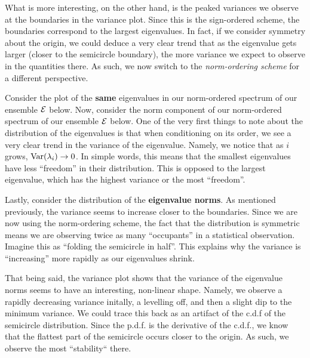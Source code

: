 What is more interesting, on the other hand, is the peaked variances we observe at the boundaries in the variance plot. Since this is the sign-ordered scheme, the boundaries correspond to the largest eigenvalues. In fact, if we consider symmetry about the origin, we could deduce a very clear trend that as the eigenvalue gets larger (closer to the semicircle boundary), the more variance we expect to observe in the quantities there. As such, we now switch to the \textit{norm-ordering scheme} for a different perspective.

\trim
{}%

\newpage

Consider the plot of the \textbf{same} eigenvalues in our norm-ordered spectrum of our ensemble $\mathcal{E}$ below.
Now, consider the norm component of our norm-ordered spectrum of our ensemble $\mathcal{E}$ below. One of the very first things to note about the distribution of the eigenvalues is that when conditioning on its order, we see a very clear trend in the variance of the eigenvalue. Namely, we notice that as $i$ grows, $\text{Var}(\lambda_i) \to 0$. In simple words, this means that the smallest eigenvalues have less ``freedom'' in their distribution. This is opposed to the largest eigenvalue, which has the highest variance or the most ``freedom''.

\trim
{}%

\newpage

Lastly, consider the distribution of the \textbf{eigenvalue norms}. As mentioned previously, the variance seems to increase closer to the boundaries. Since we are now using the norm-ordering scheme, the fact that the distribution is symmetric means we are observing twice as many ``occupants'' in a statistical observation. Imagine this as ``folding the semicircle in half''. This explains why the variance is ``increasing'' more rapidly as our eigenvalues shrink.

That being said, the variance plot shows that the variance of the eigenvalue norms seems to have an interesting, non-linear shape. Namely, we observe a rapidly decreasing variance initally, a levelling off, and then a slight dip to the minimum variance. We could trace this back as an artifact of the c.d.f of the semicircle distribution. Since the p.d.f. is the derivative of the c.d.f., we know that the flattest part of the semicircle occurs closer to the origin. As such, we observe the most ``stability`` there.

